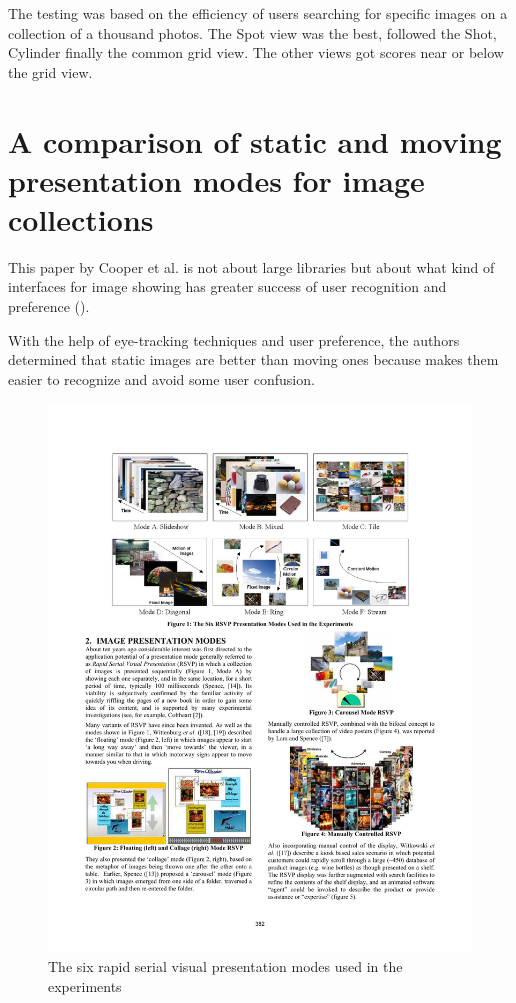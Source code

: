 The testing was based on the efficiency of users searching for specific images on a collection of a thousand photos. The Spot view was the best, followed the Shot, Cylinder finally the common grid view. The other views got scores near or below the grid view.


\section{A comparison of static and moving presentation modes for image collections} %
\label{sub:Cooper}

This paper by Cooper et al. \cite{Cooper:2006p543} is not about large libraries but about what kind of interfaces for image showing has greater success of user recognition and preference ().

With the help of eye-tracking techniques and user preference, the authors determined that static images are better than moving ones because makes them easier to recognize and avoid some user confusion.

\begin{figure}[ht]
	\centering
		\includegraphics[width=\textwidth]{imgs-RelatedWork/Cooper1}
	\caption{The six rapid serial visual presentation modes used in the experiments}
	\label{fig:Cooper1}
\end{figure}

